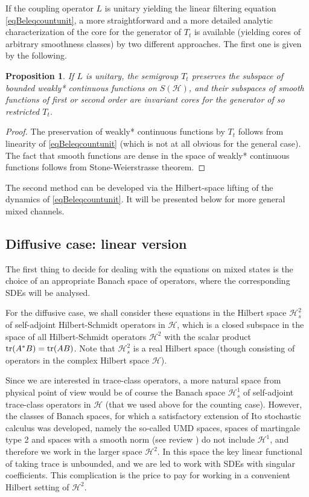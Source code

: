 \documentclass[12pt]{article}
\def\HC{\mathcal{H}}
\def\tr{\rm{tr}}
\newtheorem{prop}{Proposition}[section]
\newtheorem{remark}{Remark}
\begin{document}
If the coupling operator $L$ is unitary yielding the linear filtering equation
\eqref{eqBeleqcountunit}, a more straightforward and a more detailed analytic
characterization of the core for the generator of $T_t$ is available (yielding
cores of arbitrary smoothness classes)
by two different approaches.
The first one is given by the following.

\begin{prop}
\label{JumpWellPDE2}
If $L$ is unitary, the semigroup  $T_t$ preserves the subspace of bounded weakly* continuous functions
on $S(\HC)$, and their subspaces of smooth functions of first or second order are invariant cores
for the generator of so restricted $T_t$.
\end{prop}

\begin{proof} The preservation of weakly* continuous functions by $T_t$ follows from linearity
of \eqref{eqBeleqcountunit} (which is not at all obvious for the general case). The fact that smooth
functions are dense in the space of weakly* continuous functions follows from Stone-Weierstrasse theorem.
\end{proof}

The second method can be developed via the Hilbert-space lifting of the dynamics of \eqref{eqBeleqcountunit}.
It will be presented below for more general mixed channels.


\subsection{Diffusive case: linear version}
\label{seclineq}

The first thing to decide for dealing with the equations on mixed states is the choice
of an appropriate Banach space of operators, where the corresponding SDEs will be analysed.

For the diffusive case, we shall consider these equations in the Hilbert space $\HC^2_s$ of self-adjoint Hilbert-Schmidt
operators in $\HC$, which is a closed subspace
in the space of all Hilbert-Schmidt operators $\HC^2$ with the scalar product
${\tr} (A^*B)={\tr} (AB)$. Note that $\HC^2_s$ is a real Hilbert space
(though consisting of operators in the complex Hilbert space $\HC$).

Since we are interested in trace-class operators, a more natural
space from physical point of view  would be of course the Banach space $\HC^1_s$ of self-adjoint
trace-class operators in $\HC$ (that we used above for the counting case).
However, the classes of Banach spaces,
for which a satisfactory extension of Ito stochastic calculus was developed,
namely the so-called UMD spaces, spaces of martingale type 2 and spaces with a smooth norm
(see review \cite{VanNeerven}) do not include $\HC^1$, and therefore we work in the larger space
$\HC^2$. In this space the key linear functional of taking trace is unbounded,
and we are led to work with SDEs with singular coefficients. This complication
is the price to pay for working in a convenient Hilbert setting of $\HC^2$.
\end{document}
